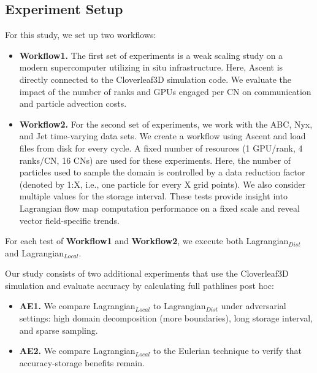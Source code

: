 \subsection{Experiment Setup}
For this study, we set up two workflows:
\begin{itemize}[leftmargin=*]
\item\textbf{Workflow1.} The first set of experiments is a weak scaling study on a modern supercomputer utilizing in situ infrastructure.
%
Here, Ascent is directly connected to the Cloverleaf3D simulation code. 
%
We 
evaluate the impact of the number of ranks and GPUs engaged per CN on communication and particle advection costs. 
%
\item\textbf{Workflow2.} For the second set of experiments, we work with the ABC, Nyx, and Jet time-varying data sets.
%
We create a workflow using Ascent and load files from disk for every cycle.
%
A fixed number of resources (1 GPU/rank, 4 ranks/CN, 16 CNs) are used for these experiments.
%
Here, the number of particles used to sample the domain is controlled by a data reduction factor (denoted by 1:X, i.e., one particle for every X grid points). 
%
%
We also consider multiple values for the storage interval. 
%
These tests provide insight into Lagrangian flow map computation performance on a fixed scale and reveal vector field-specific trends.
%
\end{itemize}

For each test of \textbf{Workflow1} and \textbf{Workflow2}, we execute both Lagrangian$_{Dist}$ and Lagrangian$_{Local}$.
%

Our study consists of two additional experiments that use the Cloverleaf3D simulation and evaluate accuracy by calculating full pathlines post hoc: 
%
\begin{itemize}[leftmargin=*]
\item\textbf{AE1.} We compare Lagrangian$_{Local}$ to Lagrangian$_{Dist}$ under adversarial settings: high domain decomposition (more boundaries), long storage interval, and sparse sampling. 
%
\item\textbf{AE2.} We compare Lagrangian$_{Local}$ to the Eulerian technique to verify that accuracy-storage benefits remain. 
\end{itemize}
